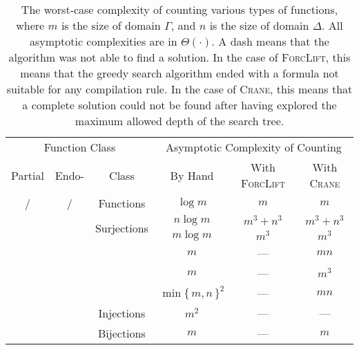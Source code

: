 \documentclass{article}
\theoremstyle{definition}
\theoremstyle{remark}
\newcommand{\cmark}{\ding{51}}%
\newcommand{\xmark}{\ding{55}}%
\begin{document}
\begin{table*}[t]
  \centering
  \begin{tabular}{cccccc}
    \toprule
    \multicolumn{3}{c}{Function Class} & \multicolumn{3}{c}{Asymptotic Complexity of Counting} \\
    Partial & Endo- & Class & By Hand & With \textsc{ForcLift} & With \textsc{Crane} \\
    \midrule
    \rowcolor{gray!25}\cmark/\xmark & \cmark/\xmark & Functions & $\log m$ & $m$ & $m$ \\
    \xmark & \xmark & \multirow{2}{*}{Surjections} & $n \log m$ & $m^{3}+n^{3}$ & $m^{3}+n^{3}$ \\
    \xmark & \cmark & & $m \log m$ & $m^{3}$ & $m^{3}$ \\
    \rowcolor{gray!25}\xmark & \xmark & & $m$ & --- & $mn$ \\
    \rowcolor{gray!25}\xmark & \cmark & & $m$ & --- & $m^3$ \\
    \rowcolor{gray!25}\cmark & \xmark & & ${\min\{\, m, n \,\}}^2$ & --- & $mn$ \\
    \rowcolor{gray!25}\cmark & \cmark & \multirow{-4}{*}{Injections} & $m^2$ & --- & --- \\
    \xmark & \xmark & Bijections & $m$ & --- & $m$ \\
    \bottomrule
  \end{tabular}
  \caption{The worst-case complexity of counting various types of functions,
    where $m$ is the size of domain $\Gamma$, and $n$ is the size of domain
    $\Delta$. All asymptotic complexities are in $\Theta(\cdot)$. A dash means
    that the algorithm was not able to find a solution. In the case of
    \textsc{ForcLift}, this means that the greedy search algorithm ended with a
    formula not suitable for any compilation rule. In the case of
    \textsc{Crane}, this means that a complete solution could not be found after
    having explored the maximum allowed depth of the search
    tree.}\label{tbl:results}
\end{table*}


\end{document}
